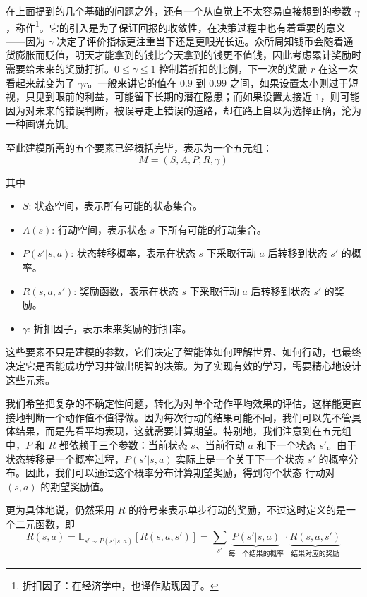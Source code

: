 在上面提到的几个基础的问题之外，还有一个从直觉上不太容易直接想到的参数 $\gamma$，称作\footnote{折扣因子：在经济学中，也译作贴现因子。}。它的引入是为了保证回报的收敛性，在决策过程中也有着重要的意义——因为 $\gamma$ 决定了评价指标更注重当下还是更眼光长远。众所周知钱币会随着通货膨胀而贬值，明天才能拿到的钱比今天拿到的钱更不值钱，因此考虑累计奖励时需要给未来的奖励打折。$0 \le \gamma \le 1$ 控制着折扣的比例，下一次的奖励 $r$ 在这一次看起来就变为了 $\gamma r$。一般来讲它的值在 $0.9$ 到 $0.99$ 之间，如果设置太小则过于短视，只见到眼前的利益，可能留下长期的潜在隐患；而如果设置太接近 $1$，则可能因为对未来的错误判断，被误导走上错误的道路，却在路上自以为选择正确，沦为一种画饼充饥。

至此建模所需的五个要素已经概括完毕，表示为一个五元组：
\[
    M = (S, A, P, R, \gamma) 
\]

其中
\begin{itemize}
    \item $S$: 状态空间，表示所有可能的状态集合。
    \item $A(s)$: 行动空间，表示状态 $s$ 下所有可能的行动集合。
    \item $P(s' | s, a)$: 状态转移概率，表示在状态 $s$ 下采取行动 $a$ 后转移到状态 $s'$ 的概率。
    \item $R(s, a, s')$: 奖励函数，表示在状态 $s$ 下采取行动 $a$ 后转移到状态 $s'$ 的奖励。
    \item $\gamma$: 折扣因子，表示未来奖励的折扣率。
\end{itemize}

这些要素不只是建模的参数，它们决定了智能体如何理解世界、如何行动，也最终决定它是否能成功学习并做出明智的决策。为了实现有效的学习，需要精心地设计这些元素。

我们希望把复杂的不确定性问题，转化为对单个动作平均效果的评估，这样能更直接地判断一个动作值不值得做。因为每次行动的结果可能不同，我们可以先不管具体结果，而是先看平均表现，这就需要计算期望。特别地，我们注意到在五元组中，$P$ 和 $R$ 都依赖于三个参数：当前状态 $s$、当前行动 $a$ 和下一个状态 $s'$。由于状态转移是一个概率过程，$P(s' | s, a)$ 实际上是一个关于下一个状态 $s'$ 的概率分布。因此，我们可以通过这个概率分布计算期望奖励，得到每个状态-行动对 $(s, a)$ 的期望奖励值。

更为具体地说，仍然采用 $R$ 的符号来表示单步行动的奖励，不过这时定义的是一个二元函数，即
\[
    R(s, a) = \mathbb{E}_{s' \sim P(s' | s, a)}[R(s, a, s')] = \sum_{s'} \underset{\text{每一个结果的概率}}{\underbrace{P(s' | s, a)}} \cdot \underset{\text{结果对应的奖励}}{\underbrace{R(s, a, s')}}
\]

